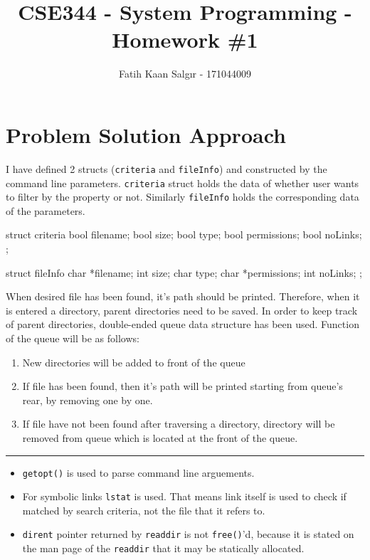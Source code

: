 \documentclass[a4paper]{article}
\author{Fatih Kaan Salgır - 171044009}
\date{}
\title{CSE344 - System Programming - Homework \#1}
\begin{document}
\maketitle

\section{Problem Solution Approach}

I have defined 2 structs (\texttt{criteria} and \texttt{fileInfo}) and constructed by the command line parameters. \texttt{criteria} struct holds the data of whether user wants to filter by the property or not. Similarly \texttt{fileInfo} holds the corresponding data of the parameters.

\begin{ccode}
struct criteria {
  bool filename;
  bool size;
  bool type;
  bool permissions;
  bool noLinks;
};

struct fileInfo {
  char *filename;
  int size;
  char type;
  char *permissions;
  int noLinks;
};
\end{ccode}

When desired file has been found, it's path should be printed. Therefore, when it is entered a directory, parent directories need to be saved. In order to keep track of parent directories, double-ended queue data structure has been used. Function of the queue will be as follows:
\begin{enumerate}
\item New directories will be added to front of the queue
\item If file has been found, then it's path will be printed starting from queue's rear, by removing one by one.
\item If file have not been found after traversing a directory, directory will be removed from queue which is located at the front of the queue.
\end{enumerate}

\noindent\rule{\textwidth}{0.5pt}

\begin{itemize}
\item \texttt{getopt()} is used to parse command line arguements.
\item For symbolic links \texttt{lstat} is used. That means link itself is used to check if matched by search criteria, not the file that it refers to.
\item \texttt{dirent} pointer returned by \texttt{readdir} is not \texttt{free()}'d, because it is stated on the man page of the \texttt{readdir} that it may be statically allocated.
\end{itemize}
\end{document}
